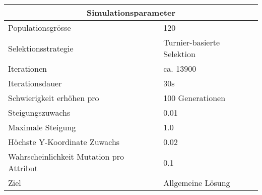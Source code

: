 
\begin{tabular}{ | l | l | }

  \hline
  \multicolumn{2}{|c|}{Simulationsparameter} \\
  \hline
  Populationsgrösse & 120 \\ \hline
  Selektionsstrategie & Turnier-basierte Selektion \\ \hline
  Iterationen & ca. 13900 \\ \hline
  Iterationsdauer & 30s \\ \hline
  Schwierigkeit erhöhen pro & 100 Generationen \\ \hline
  Steigungszuwachs & 0.01 \\ \hline
  Maximale Steigung & 1.0 \\ \hline
  Höchste Y-Koordinate Zuwachs  & 0.02 \\ \hline
  Wahrscheinlichkeit Mutation pro Attribut & 0.1 \\ \hline
  Ziel & Allgemeine Lösung \\ \hline
  
\end{tabular}

